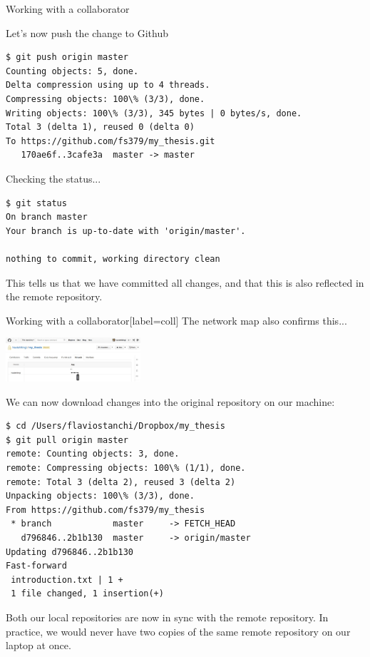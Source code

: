 \documentclass[10pt]{beamer}
\begin{document}
\begin{frame}[fragile]{Working with a collaborator}

Let's now push the change to Github
\begin{lstlisting}
$ git push origin master
Counting objects: 5, done.
Delta compression using up to 4 threads.
Compressing objects: 100\% (3/3), done.
Writing objects: 100\% (3/3), 345 bytes | 0 bytes/s, done.
Total 3 (delta 1), reused 0 (delta 0)
To https://github.com/fs379/my_thesis.git
   170ae6f..3cafe3a  master -> master
\end{lstlisting}
Checking the status...
\begin{lstlisting}
$ git status
On branch master
Your branch is up-to-date with 'origin/master'.

nothing to commit, working directory clean
\end{lstlisting}
This tells us that we have committed all changes, and that this is also reflected in the remote repository.


\end{frame}

\begin{frame}[fragile]{Working with a collaborator}[label=coll]
The network map also confirms this...
\begin{center}
\includegraphics[width=5cm]{./auxfiles/Network_update.jpg}
\end{center}
We can now download changes into the original repository on our machine:
\begin{lstlisting}
$ cd /Users/flaviostanchi/Dropbox/my_thesis
$ git pull origin master
remote: Counting objects: 3, done.
remote: Compressing objects: 100\% (1/1), done.
remote: Total 3 (delta 2), reused 3 (delta 2)
Unpacking objects: 100\% (3/3), done.
From https://github.com/fs379/my_thesis
 * branch            master     -> FETCH_HEAD
   d796846..2b1b130  master     -> origin/master
Updating d796846..2b1b130
Fast-forward
 introduction.txt | 1 +
 1 file changed, 1 insertion(+)
\end{lstlisting}
Both our local repositories are now in sync with the remote repository. In practice, we would never have two copies of the same remote repository on our laptop at once.
\end{frame}
\end{document}
